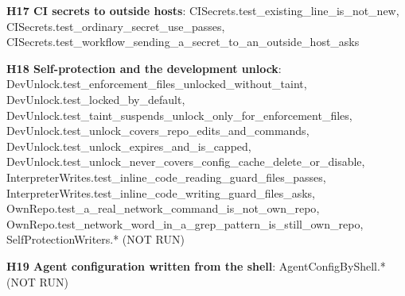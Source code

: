 \documentclass[10pt,a4paper]{article}
\begin{document}
\textbf{H17 CI secrets to outside hosts}: \textcolor{ok}{CISecrets.\allowbreak{}test\_\allowbreak{}existing\_\allowbreak{}line\_\allowbreak{}is\_\allowbreak{}not\_\allowbreak{}new}, \textcolor{ok}{CISecrets.\allowbreak{}test\_\allowbreak{}ordinary\_\allowbreak{}secret\_\allowbreak{}use\_\allowbreak{}passes}, \textcolor{ok}{CISecrets.\allowbreak{}test\_\allowbreak{}workflow\_\allowbreak{}sending\_\allowbreak{}a\_\allowbreak{}secret\_\allowbreak{}to\_\allowbreak{}an\_\allowbreak{}outside\_\allowbreak{}host\_\allowbreak{}asks}\par
\textbf{H18 Self-protection and the development unlock}: \textcolor{ok}{DevUnlock.\allowbreak{}test\_\allowbreak{}enforcement\_\allowbreak{}files\_\allowbreak{}unlocked\_\allowbreak{}without\_\allowbreak{}taint}, \textcolor{ok}{DevUnlock.\allowbreak{}test\_\allowbreak{}locked\_\allowbreak{}by\_\allowbreak{}default}, \textcolor{ok}{DevUnlock.\allowbreak{}test\_\allowbreak{}taint\_\allowbreak{}suspends\_\allowbreak{}unlock\_\allowbreak{}only\_\allowbreak{}for\_\allowbreak{}enforcement\_\allowbreak{}files}, \textcolor{ok}{DevUnlock.\allowbreak{}test\_\allowbreak{}unlock\_\allowbreak{}covers\_\allowbreak{}repo\_\allowbreak{}edits\_\allowbreak{}and\_\allowbreak{}commands}, \textcolor{ok}{DevUnlock.\allowbreak{}test\_\allowbreak{}unlock\_\allowbreak{}expires\_\allowbreak{}and\_\allowbreak{}is\_\allowbreak{}capped}, \textcolor{ok}{DevUnlock.\allowbreak{}test\_\allowbreak{}unlock\_\allowbreak{}never\_\allowbreak{}covers\_\allowbreak{}config\_\allowbreak{}cache\_\allowbreak{}delete\_\allowbreak{}or\_\allowbreak{}disable}, \textcolor{ok}{InterpreterWrites.\allowbreak{}test\_\allowbreak{}inline\_\allowbreak{}code\_\allowbreak{}reading\_\allowbreak{}guard\_\allowbreak{}files\_\allowbreak{}passes}, \textcolor{ok}{InterpreterWrites.\allowbreak{}test\_\allowbreak{}inline\_\allowbreak{}code\_\allowbreak{}writing\_\allowbreak{}guard\_\allowbreak{}files\_\allowbreak{}asks}, \textcolor{ok}{OwnRepo.\allowbreak{}test\_\allowbreak{}a\_\allowbreak{}real\_\allowbreak{}network\_\allowbreak{}command\_\allowbreak{}is\_\allowbreak{}not\_\allowbreak{}own\_\allowbreak{}repo}, \textcolor{ok}{OwnRepo.\allowbreak{}test\_\allowbreak{}network\_\allowbreak{}word\_\allowbreak{}in\_\allowbreak{}a\_\allowbreak{}grep\_\allowbreak{}pattern\_\allowbreak{}is\_\allowbreak{}still\_\allowbreak{}own\_\allowbreak{}repo}, \textcolor{bad}{SelfProtectionWriters.\allowbreak{}*  (NOT RUN)}\par
\textbf{H19 Agent configuration written from the shell}: \textcolor{bad}{AgentConfigByShell.\allowbreak{}*  (NOT RUN)}\par
\end{document}
